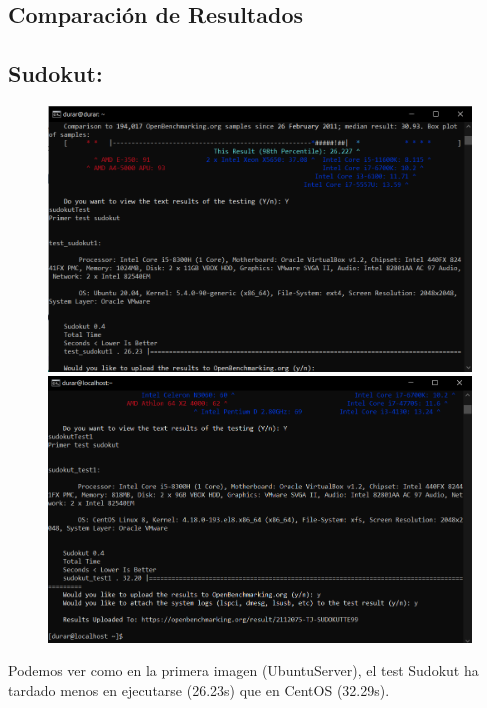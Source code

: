 \documentclass[a4paper]{article}
\begin{document}
\subsection{Comparación de Resultados}
\subsection*{\textbf{Sudokut:}}
\begin{figure}[hbt!]
    \centering
    \includegraphics[width=\textwidth]{resultado_sudokut1.png}
    \includegraphics[width=\textwidth]{resultado_sudokut_centos.png}
\end{figure}
Podemos ver como en la primera imagen (UbuntuServer), el test Sudokut ha tardado menos 
en ejecutarse (26.23s) que en CentOS (32.29s).
\end{document}
